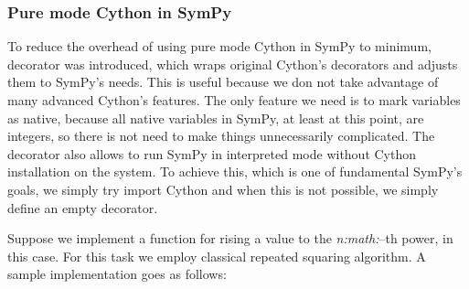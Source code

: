 \subsubsection{Pure mode Cython in SymPy}

To reduce the overhead of using pure mode Cython in SymPy to minimum,  decorator
was introduced, which wraps original Cython's decorators and adjusts them to SymPy's needs. This
is useful because we don not take advantage of many advanced Cython's features. The only feature
we need is to mark variables as native, because all native variables in SymPy, at least at this
point, are integers, so there is not need to make things unnecessarily complicated. The decorator
also allows to run SymPy in interpreted mode without Cython installation on the system. To achieve
this, which is one of fundamental SymPy's goals, we simply try import Cython and when this is not
possible, we simply define an empty decorator.

Suppose we implement a function for rising a value to the \emph{n:math:}--th power,  in this case.
For this task we employ classical repeated squaring algorithm. A sample implementation goes as follows:

